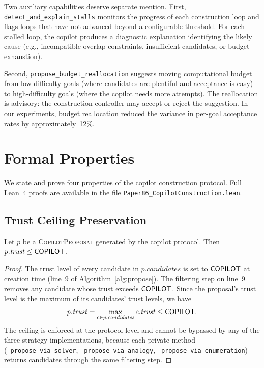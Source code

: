\documentclass[11pt]{article}
\newcommand{\CP}{\textsc{CopilotProposal}}
\begin{document}
Two auxiliary capabilities deserve separate mention.  First,
\texttt{detect\_and\_explain\_stalls} monitors the progress of
each construction loop and flags loops that have not advanced
beyond a configurable threshold.  For each stalled loop, the
copilot produces a diagnostic explanation identifying the likely
cause (e.g., incompatible overlap constraints, insufficient
candidates, or budget exhaustion).

Second, \texttt{propose\_budget\_reallocation} suggests moving
computational budget from low-difficulty goals (where candidates
are plentiful and acceptance is easy) to high-difficulty goals
(where the copilot needs more attempts).  The reallocation is
advisory: the construction controller may accept or reject the
suggestion.  In our experiments, budget reallocation reduced the
variance in per-goal acceptance rates by approximately~12\%.

\section{Formal Properties}\label{sec:formal}

We state and prove four properties of the copilot construction
protocol.  Full Lean~4 proofs are available in the file
\texttt{Paper86\_CopilotConstruction.lean}.

\subsection{Trust Ceiling Preservation}\label{sec:formal-trust}

\begin{theorem}\label{thm:trust-ceil}
Let $p$ be a \CP{} generated by the copilot protocol.  Then
$p.\mathit{trust} \leq \mathsf{COPILOT}$.
\end{theorem}

\begin{proof}
The trust level of every candidate in $p.\mathit{candidates}$ is
set to $\mathsf{COPILOT}$ at creation time (line~9 of
Algorithm~\ref{alg:propose}).  The filtering step on line~9
removes any candidate whose trust exceeds $\mathsf{COPILOT}$.  Since the
proposal's trust level is the maximum of its candidates' trust
levels, we have
\[
  p.\mathit{trust}
  = \max_{c \in p.\mathit{candidates}} c.\mathit{trust}
  \leq \mathsf{COPILOT}.
\]
The ceiling is enforced at the protocol level and cannot be
bypassed by any of the three strategy implementations, because
each private method (\texttt{\_propose\_via\_solver},
\texttt{\_propose\_via\_analogy},
\texttt{\_propose\_via\_enumeration}) returns candidates through
the same filtering step.
\end{proof}
\end{document}
